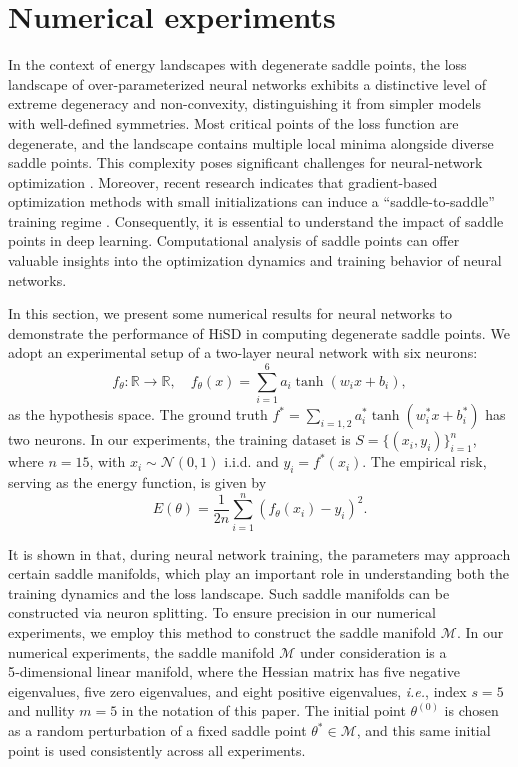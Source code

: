 \documentclass[final]{siamart251216}
\begin{document}
\section{Numerical experiments}\label{sec:4}
In the context of energy landscapes with degenerate saddle points, the loss landscape of over-parameterized neural networks exhibits a distinctive level of extreme degeneracy and non-convexity, distinguishing it from simpler models with well-defined symmetries. 
Most critical points of the loss function are degenerate, and the landscape contains multiple local minima alongside diverse saddle points. 
This complexity poses significant challenges for neural-network optimization \cite{NIPS2014}.
Moreover, recent research indicates that gradient-based optimization methods with small initializations can induce a ``saddle-to-saddle'' training regime \cite{Pesme2023Saddle}. 
Consequently, it is essential to understand the impact of saddle points in deep learning. 
Computational analysis of saddle points can offer valuable insights into the optimization dynamics and training behavior of neural networks.

In this section, we present some numerical results for neural networks to demonstrate the performance of HiSD in computing degenerate saddle points.
We adopt an experimental setup of a two-layer neural network with six neurons:
\begin{equation}
f_{\theta}: \mathbb{R} \to \mathbb{R}, \quad
f_{\theta}(x) = \sum_{i=1}^{6} a_i \tanh(w_i x + b_i),
\end{equation}
as the hypothesis space. 
The ground truth $f^*=\sum_{i=1,2} a_i^* \tanh(w_i^* x + b_i^*)$ has two neurons.
In our experiments, the training dataset is $S=\{(x_i,y_i)\}_{i=1}^n$, where $n=15$, with $x_i \sim  \mathcal{N}(0,1)$ i.i.d. and $y_i=f^*(x_i)$. 
The empirical risk, serving as the energy function, is given by
\begin{equation}
E({\theta})=\frac{1}{2n}\sum_{i=1}^{n}\left(f_{\theta}({x}_{i})-y_{i}\right)^{2}.
\end{equation}

It is shown in \cite{zhang2021embedding} that, during neural network training, the parameters may approach certain saddle manifolds, which play an important role in understanding both the training dynamics and the loss landscape. 
Such saddle manifolds can be constructed via neuron splitting. 
To ensure precision in our numerical experiments, we employ this method to construct the saddle manifold $\mathcal{M}$. 
In our numerical experiments, the saddle manifold $\mathcal{M}$ under consideration is a 5‑dimensional linear manifold, where the Hessian matrix has five negative eigenvalues, five zero eigenvalues, and eight positive eigenvalues,
\textit{i.e.}, index $s=5$ and nullity $m=5$ in the notation of this paper.
The initial point $\theta^{(0)}$ is chosen as a random perturbation of a fixed saddle point $\theta^* \in \mathcal{M}$, and this same initial point is used consistently across all experiments.
\end{document}
